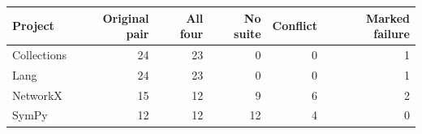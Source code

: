 \begin{tabular}{lrrrrr}
\toprule
Project & Original pair & All four & No suite & Conflict & Marked failure \\
\midrule
Collections & 24 & 23 & 0 & 0 & 1 \\
Lang & 24 & 23 & 0 & 0 & 1 \\
NetworkX & 15 & 12 & 9 & 6 & 2 \\
SymPy & 12 & 12 & 12 & 4 & 0 \\
\bottomrule
\end{tabular}
